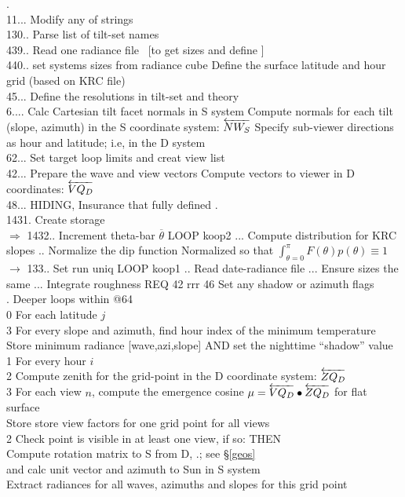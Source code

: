 \documentclass{article}
\newcommand{\qh}[1]{\\ \hspace*{#1.em} #1 \hspace*{0.4em} } %
\newcommand{\qH}[1]{\\ \hspace*{#1.em}  \hspace*{1.3em} } %
\begin{document}
.
\\ 11... Modify any of strings
\\ 130.. Parse list of tilt-set names
\\ 439.. Read one radiance file  \ [to get sizes  and define ]
\\ 440.. set systems sizes from radiance cube
\qii  Define the surface latitude and hour grid (based on KRC file)
\\ 45... Define the resolutions in tilt-set and theory
\\ 6.... Calc Cartesian tilt facet normals in S system
\qii Compute normals for each tilt (slope, azimuth) in the S coordinate system: $\overleftarrow{NW_S}$
\qii Specify sub-viewer directions as hour and latitude; i.e, in the D system
\\ 62... Set target loop limits and creat view list
\\ 42... Prepare the wave and view vectors
\qii Compute vectors to viewer in D coordinates: $\overleftarrow{VQ_D}$
\\ 48... HIDING, Insurance that  fully defined
\pagebreak .
\\ 1431. Create storage
\\ $\Longrightarrow$ 1432.. Increment theta-bar $\overline{\theta}$  LOOP  koop2
... Compute distribution for KRC slopes 
.. Normalize the dip function 
\qii  Normalized so that $\int_{\theta=0}^\pi F(\theta)p(\theta) \equiv 1 $
\qi $\longrightarrow$  133.. Set run uniq  LOOP koop1
.. Read date-radiance file
... Ensure sizes the same
... Integrate roughness REQ 42 rrr 46 
\qiii Set any shadow or azimuth flags  %
\\ .  \hrulefill Deeper loops within @64 \hrulefill \hspace{3.in}
\qh{0} For each latitude $j$
\qh{3} For every slope and azimuth, find hour index of the minimum temperature %
\qH{3} Store minimum radiance [wave,azi,slope] AND set the nighttime ``shadow'' value 
\qh{1} For every hour $i$
\qh{2} Compute zenith for the grid-point in the D coordinate system: $\overleftarrow{ZQ_D}$
\qh{3} For each view $n$, compute the emergence cosine $\mu =\overleftarrow{VQ_D} \bullet \overleftarrow{ZQ_D}$ for flat surface %
\qH{3} Store store view factors for one grid point for all views %
\qh{2} Check point is visible in at least one view, if so: THEN
\qH{2} Compute rotation matrix to S from D, .; see \S \ref{geos}   %
\qH{2} and calc unit vector and azimuth to Sun in S system  
\qH{2} Extract radiances for all waves, azimuths and slopes for this grid point %
\end{document}

